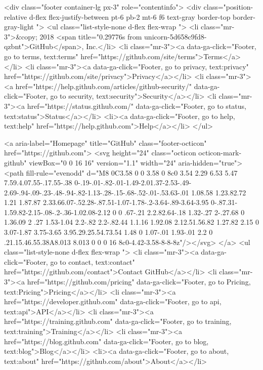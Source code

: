         
<div class="footer container-lg px-3" role="contentinfo">
  <div class="position-relative d-flex flex-justify-between pt-6 pb-2 mt-6 f6 text-gray border-top border-gray-light ">
    <ul class="list-style-none d-flex flex-wrap ">
      <li class="mr-3">&copy; 2018 <span title="0.29776s from unicorn-5d658c9fd8-qzbnt">GitHub</span>, Inc.</li>
        <li class="mr-3"><a data-ga-click="Footer, go to terms, text:terms" href="https://github.com/site/terms">Terms</a></li>
        <li class="mr-3"><a data-ga-click="Footer, go to privacy, text:privacy" href="https://github.com/site/privacy">Privacy</a></li>
        <li class="mr-3"><a href="https://help.github.com/articles/github-security/" data-ga-click="Footer, go to security, text:security">Security</a></li>
        <li class="mr-3"><a href="https://status.github.com/" data-ga-click="Footer, go to status, text:status">Status</a></li>
        <li><a data-ga-click="Footer, go to help, text:help" href="https://help.github.com">Help</a></li>
    </ul>

    <a aria-label="Homepage" title="GitHub" class="footer-octicon" href="https://github.com">
      <svg height="24" class="octicon octicon-mark-github" viewBox="0 0 16 16" version="1.1" width="24" aria-hidden="true"><path fill-rule="evenodd" d="M8 0C3.58 0 0 3.58 0 8c0 3.54 2.29 6.53 5.47 7.59.4.07.55-.17.55-.38 0-.19-.01-.82-.01-1.49-2.01.37-2.53-.49-2.69-.94-.09-.23-.48-.94-.82-1.13-.28-.15-.68-.52-.01-.53.63-.01 1.08.58 1.23.82.72 1.21 1.87.87 2.33.66.07-.52.28-.87.51-1.07-1.78-.2-3.64-.89-3.64-3.95 0-.87.31-1.59.82-2.15-.08-.2-.36-1.02.08-2.12 0 0 .67-.21 2.2.82.64-.18 1.32-.27 2-.27.68 0 1.36.09 2 .27 1.53-1.04 2.2-.82 2.2-.82.44 1.1.16 1.92.08 2.12.51.56.82 1.27.82 2.15 0 3.07-1.87 3.75-3.65 3.95.29.25.54.73.54 1.48 0 1.07-.01 1.93-.01 2.2 0 .21.15.46.55.38A8.013 8.013 0 0 0 16 8c0-4.42-3.58-8-8-8z"/></svg>
</a>
   <ul class="list-style-none d-flex flex-wrap ">
        <li class="mr-3"><a data-ga-click="Footer, go to contact, text:contact" href="https://github.com/contact">Contact GitHub</a></li>
        <li class="mr-3"><a href="https://github.com/pricing" data-ga-click="Footer, go to Pricing, text:Pricing">Pricing</a></li>
      <li class="mr-3"><a href="https://developer.github.com" data-ga-click="Footer, go to api, text:api">API</a></li>
      <li class="mr-3"><a href="https://training.github.com" data-ga-click="Footer, go to training, text:training">Training</a></li>
        <li class="mr-3"><a href="https://blog.github.com" data-ga-click="Footer, go to blog, text:blog">Blog</a></li>
        <li><a data-ga-click="Footer, go to about, text:about" href="https://github.com/about">About</a></li>

